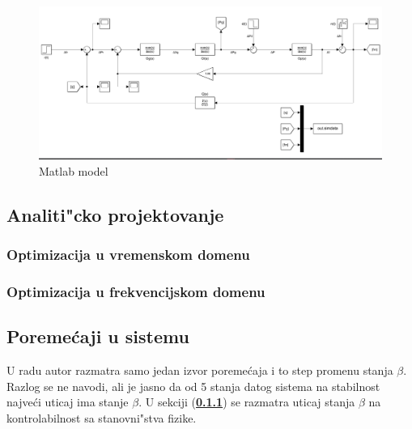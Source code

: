 \documentclass[a4paper,11pt]{article}
\theoremstyle{definition} \newtheorem{deff}{Definicija}[section]
\theoremstyle{definition} \newtheorem{prim}[deff]{Primer}
\theoremstyle{plain} \newtheorem{teor}[deff]{Teorema}
\begin{document}
	
	
	\begin{figure}[!htb]
		\centering
		\includegraphics[width=0.45\linewidth]{slike/model.png}
		\caption{}
		\label{fig:model}
		
		\caption{Matlab model}
	\end{figure}
	
	
	
	
	
	
	\clearpage
	

	
	
	\subsection{Analiti"cko projektovanje}
	\label{sec:linearizacija}
	

	
	\subsubsection{Optimizacija u vremenskom domenu} \label{sec:kontrolabilnost}
	

	
	
	\subsubsection{Optimizacija u frekvencijskom domenu}
	
	

	
	\subsection{Poremećaji u sistemu}
	
	U radu \cite{inicijalna} autor razmatra samo jedan izvor poreme\'caja i to step promenu stanja $\beta$. Razlog se ne navodi, ali je jasno da od 5 stanja datog sistema na stabilnost najve\'ci uticaj ima stanje $\beta$. U sekciji (\textbf{\ref{sec:kontrolabilnost}}) se razmatra uticaj stanja $\beta$ na kontrolabilnost sa stanovni"stva fizike. \\
	

	
	

	
	
\end{document}
